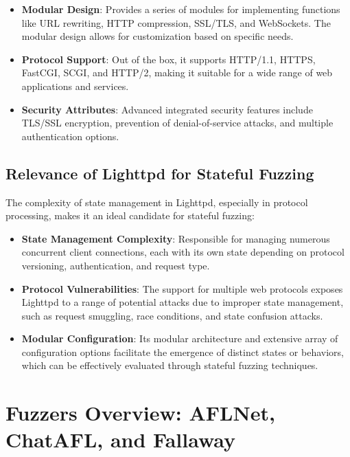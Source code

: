 \begin{itemize}
    \item \textbf{Modular Design}: Provides a series of modules for implementing functions like URL rewriting, HTTP compression, SSL/TLS, and WebSockets. The modular design allows for customization based on specific needs.
    
    \item \textbf{Protocol Support}: Out of the box, it supports HTTP/1.1, HTTPS, FastCGI, SCGI, and HTTP/2, making it suitable for a wide range of web applications and services.
    
    \item \textbf{Security Attributes}: Advanced integrated security features include TLS/SSL encryption, prevention of denial-of-service attacks, and multiple authentication options.
\end{itemize}

\subsection{Relevance of Lighttpd for Stateful Fuzzing}
The complexity of state management in Lighttpd, especially in protocol processing, makes it an ideal candidate for stateful fuzzing:

\begin{itemize}
    \item \textbf{State Management Complexity}: Responsible for managing numerous concurrent client connections, each with its own state depending on protocol versioning, authentication, and request type.
    
    \item \textbf{Protocol Vulnerabilities}: The support for multiple web protocols exposes Lighttpd to a range of potential attacks due to improper state management, such as request smuggling, race conditions, and state confusion attacks.
    
    \item \textbf{Modular Configuration}: Its modular architecture and extensive array of configuration options facilitate the emergence of distinct states or behaviors, which can be effectively evaluated through stateful fuzzing techniques.
\end{itemize}

\section{Fuzzers Overview: AFLNet, ChatAFL, and Fallaway}

